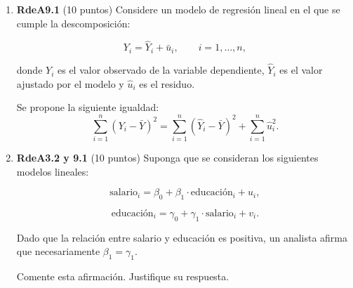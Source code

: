 \documentclass[10pt,a4paper]{article}
\begin{document}
\begin{enumerate}
    \item \textbf{RdeA9.1} (10 puntos) 
Considere un modelo de regresión lineal en el que se cumple la descomposición:

\[
Y_i = \hat{Y}_i + \bar{u}_i, \qquad i = 1,\dots,n,
\]

donde $Y_i$ es el valor observado de la variable dependiente, $\hat{Y}_i$ es el valor ajustado por el modelo y $\hat{u}_i$ es el residuo. 

Se propone la siguiente igualdad:
\[
\sum_{i=1}^n (Y_i - \bar{Y})^2 
= \sum_{i=1}^n (\hat{Y}_i - \bar{Y})^2 
+ \sum_{i=1}^n \hat{u}_i^2.
\]












     \item \textbf{RdeA3.2 y 9.1} (10 puntos) Suponga que se consideran los siguientes modelos lineales:

\[
\text{salario}_i = \beta_0 + \beta_1 \cdot \text{educación}_i + u_i,
\]

\[
\text{educación}_i = \gamma_0 + \gamma_1 \cdot \text{salario}_i + v_i.
\]

Dado que la relación entre salario y educación es positiva, un analista afirma que necesariamente 
$\beta_1 = \gamma_1$. 

Comente esta afirmación. Justifique su respuesta.

    
    



\end{enumerate}
\end{document}
